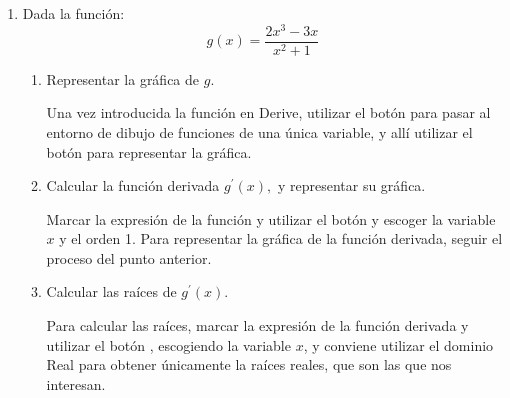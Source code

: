 \begin{enumerate}[leftmargin=*]
\begin{indicacion}
{\begin{enumerate}
\item Para el cálculo de la derivada $n$-ésima, teniendo en cuenta
que en el cuadro de diálogo que aparece al pinchar en el botón
 tan sólo podemos introducir como orden
de la misma un número entero, pero nunca un parámetro como $n$, no
queda otra posibilidad que proceder por inducción, y a la vista de
las primeras derivadas suponer cuál sería el valor de la derivada de
orden $n$. Posteriormente, podemos comprobar que nuestra suposición
es correcta utilizando la fórmula que hemos encontrado para calcular
una derivada de orden bastante alto y comparando con el valor que da
Derive para esa misma derivada.

\end{enumerate}
}
\end{indicacion}
\item  Dada la función:
\[
g(x)=\dfrac{2x^{3}-3x}{x^{2}+1}
\]

\begin{enumerate}
\item  Representar la gráfica de $g$.

\begin{indicacion}
{Una vez introducida la función en Derive, utilizar el botón
 para pasar al entorno de dibujo de funciones de
una única variable, y allí utilizar el botón  para representar la gráfica. }
\end{indicacion}

\item  Calcular la función derivada $g^{\prime }(x),$ y representar su
gráfica.

\begin{indicacion}
{Marcar la expresión de la función y utilizar el botón  y escoger la variable $x$ y el orden 1. Para
representar la gráfica de la función derivada, seguir el proceso del
punto anterior. }
\end{indicacion}

\item  Calcular las raíces de $g^{\prime }(x).$

\begin{indicacion}
{Para calcular las raíces, marcar la expresión de la función
derivada y utilizar el botón , escogiendo
la variable $x$, y conviene utilizar el dominio Real para obtener
únicamente la raíces reales, que son las que nos interesan.

}
\end{indicacion}


\end{enumerate}
\end{enumerate}
